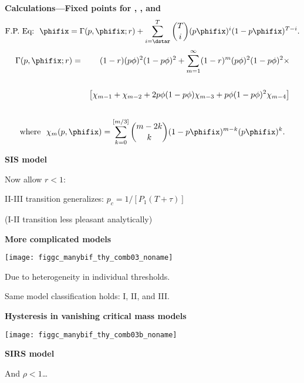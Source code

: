 % 
% 
% 
% 
  \textbf{Calculations---Fixed points for , , and }
  $$
  \mbox{F.P.\ Eq:} \ \
  \phifix = \Gamma(p,\phifix;r) 
  + \sum_{i=\dstar}^{T}
  \binom{T}{i}
  (p\phifix)^{i} (1 - p\phifix)^{T-i}.
  $$
  \begin{eqnarray*}
  \Gamma(p,\phifix;r) & = & (1-r)(p\phi)^2 (1-p\phi)^2 
   +  \sum_{m=1}^{\infty} (1-r)^m 
  (p\phi)^2 (1-p\phi)^2 \times
  \\ \nonumber
  \\ \nonumber
  &  & 
  \left[ 
    \chi_{m-1} + 
    \chi_{m-2} + 
    2p\phi (1-p\phi)\chi_{m-3} + 
    p\phi (1-p\phi)^2\chi_{m-4}
  \right]
  \\ \nonumber
  \end{eqnarray*}
  $$
  \mbox{where} \ \  \chi_m(p,\phifix)
  = 
  \sum_{k=0}^{[m/3]}
  \binom{m-2k}{k}
  (1-p\phifix)^{m-k}
  (p\phifix)^k.
  $$



  \textbf{SIS model}

  Now allow $r<1$: \hfill

II-III transition generalizes: $p_c = 1/[P_1 (T + \tau)]$ 

(I-II transition less pleasant analytically)


  \textbf{More complicated models}

  \texttt{[image: figgc\_manybif\_thy\_comb03\_noname]}

   Due to heterogeneity in individual thresholds.

   Same model classification holds:  I, II, and III.

  \textbf{Hysteresis in vanishing critical mass models}

  \centering
  \texttt{[image: figgc\_manybif\_thy\_comb03b\_noname]}


 

  \textbf{SIRS model}

  And $\rho<1$\ldots \hfill

